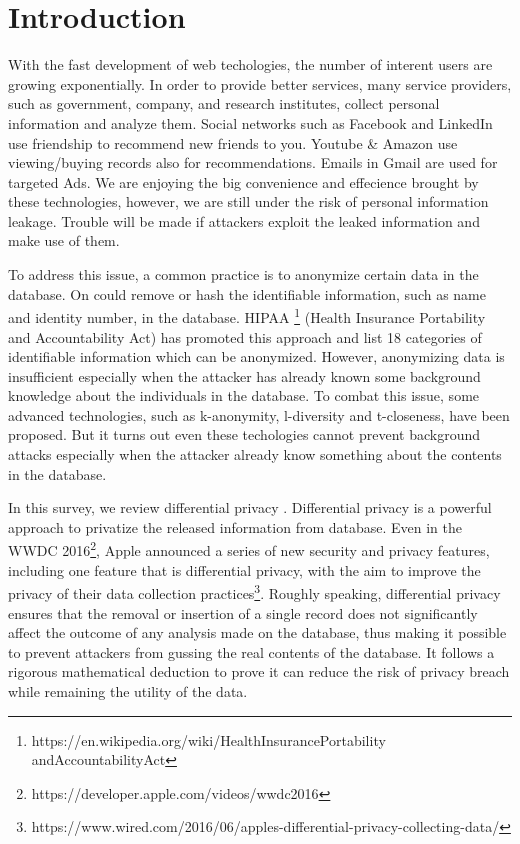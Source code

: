 \documentclass[a4paper, 11pt]{article} %
\begin{document}
\section{Introduction}
With the fast development of web techologies, the number of interent users are growing exponentially. In order to provide better services, many service providers, such as government, company, and research institutes, collect personal information and analyze them. Social networks such as Facebook and LinkedIn use friendship to recommend new friends to you. Youtube \& Amazon use viewing/buying records also for recommendations. Emails in Gmail are used for targeted Ads. We are enjoying the big convenience and effecience brought by these technologies, however, we are still under the risk of personal information leakage. Trouble will be made if attackers exploit the leaked information and make use of them.

To address this issue, a common practice is to anonymize certain data in the database. On could remove or hash the identifiable information, such as name and identity number, in the database. HIPAA \footnote{https://en.wikipedia.org/wiki/Health\textunderscore Insurance\textunderscore Portability \textunderscore and\textunderscore Accountability\textunderscore Act}  (Health Insurance Portability and Accountability Act) has promoted this approach and list 18 categories of identifiable information which can be anonymized. However, anonymizing data is insufficient especially when the attacker has already known some background knowledge about the individuals in the database. To combat this issue, some advanced technologies, such as k-anonymity\cite{sweeney2002k}, l-diversity\cite{machanavajjhala2007diversity} and t-closeness\cite{li2007t}, have been proposed. But it turns out even these techologies cannot prevent background attacks especially when the attacker already know something about the contents in the database\cite{ji2014differential}.

In this survey, we review differential privacy\cite{dwork2008differential, dwork2014algorithmic} . Differential privacy is a powerful approach to privatize the released information from database. Even in the WWDC 2016\footnote{https://developer.apple.com/videos/wwdc2016}, Apple announced a series of new security and privacy features, including one feature that is differential privacy, with the aim to improve the privacy of their data collection practices\footnote{https://www.wired.com/2016/06/apples-differential-privacy-collecting-data/}. Roughly speaking, differential privacy ensures that the removal or insertion of a single record does not significantly affect the outcome of any analysis made on the database, thus making it possible to prevent attackers from gussing the real contents of the database. It follows a rigorous mathematical deduction to prove it can reduce the risk of privacy breach while remaining the utility of the data.
\end{document}
